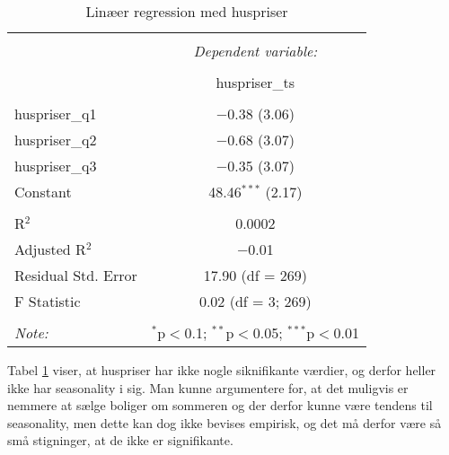 \documentclass[
  10pt,
]{article}
\begin{document}
\begin{table}[!htbp] \centering 
  \caption{Linæer regression med huspriser} 
  \label{tab:tabel3} 
\begin{tabular}{@{\extracolsep{5pt}}lc} 
\\[-1.8ex]\hline 
\hline \\[-1.8ex] 
 & \multicolumn{1}{c}{\textit{Dependent variable:}} \\ 
\cline{2-2} 
\\[-1.8ex] & huspriser\_ts \\ 
\hline \\[-1.8ex] 
 huspriser\_q1 & $-$0.38 (3.06) \\ 
  huspriser\_q2 & $-$0.68 (3.07) \\ 
  huspriser\_q3 & $-$0.35 (3.07) \\ 
  Constant & 48.46$^{***}$ (2.17) \\ 
 \hline \\[-1.8ex] 
R$^{2}$ & 0.0002 \\ 
Adjusted R$^{2}$ & $-$0.01 \\ 
Residual Std. Error & 17.90 (df = 269) \\ 
F Statistic & 0.02 (df = 3; 269) \\ 
\hline 
\hline \\[-1.8ex] 
\textit{Note:}  & \multicolumn{1}{r}{$^{*}$p$<$0.1; $^{**}$p$<$0.05; $^{***}$p$<$0.01} \\ 
\end{tabular} 
\end{table}

Tabel \ref{tab:tabel3} viser, at huspriser har ikke nogle siknifikante
værdier, og derfor heller ikke har seasonality i sig. Man kunne
argumentere for, at det muligvis er nemmere at sælge boliger om sommeren
og der derfor kunne være tendens til seasonality, men dette kan dog ikke
bevises empirisk, og det må derfor være så små stigninger, at de ikke er
signifikante. \newpage
\end{document}
